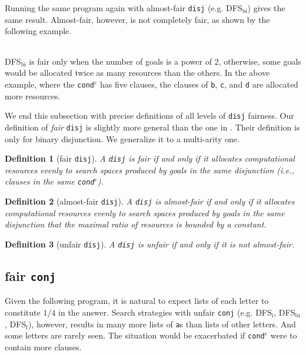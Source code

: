 \documentclass[format=acmlarge, review=true, authordraft=true]{acmart}
\newcommand{\conde}{\texttt{cond$^e$}}
\newcommand{\conj}{\texttt{conj}}
\newcommand{\disj}{\texttt{disj}}
\newcommand{\DFSi }[0]{DFS$_\textrm{i}$}
\newcommand{\DFSf }[0]{DFS$_\textrm{f}$}
\newcommand{\DFSbi}[0]{DFS$_\textrm{bi}$}
\newtheorem{defn}{Definition}[section]
\begin{document}
Running the same program again with almost-fair \disj {} (e.g. 
DFS$_\textrm{bi}$) gives the same result. Almost-fair, however, is not 
completely fair, as shown by the following example. 

\begin{center}
	\begin{tabular}{c}
		
	\end{tabular}
\end{center}

\DFSbi{} is fair only when the number of goals is a power of 2, 
otherwise, some goals would be allocated twice as many resources than the 
others. In the above example, where the \conde{} has five clauses, the clauses 
of \texttt{b}, \texttt{c}, and \texttt{d} are allocated more resources.

We end this subsection with precise definitions of all levels of 
\disj{} fairness. Our definition of \emph{fair} \disj{} is slightly 
more general
than the one in \citet{seres1999algebra}. Their definition is only
for binary disjunction. We generalize it to a multi-arity one.

\begin{defn}[fair \disj{}]
A \disj{} is fair if and only if it allocates computational resources evenly to 
search spaces produced by goals in the same disjunction 
(i.e., clauses in the same \conde).
\end{defn}

\begin{defn}[almost-fair \disj{}]
A \disj{} is almost-fair if and only if it allocates computational resources
evenly to search spaces produced by goals in the same disjunction that 
the maximal ratio of resources is bounded by a constant.
\end{defn}

\begin{defn}[unfair \disj{}]
A \disj{} is unfair if and only if it is not almost-fair.
\end{defn}

\subsection{fair \texttt{conj}}


Given the following program, it is natural to expect lists of each letter to
constitute $1/4$ in the answer. Search strategies with unfair \conj{} (e.g. 
\DFSi, \DFSbi, \DFSf), however, results in many more lists of \texttt{a}s than 
lists of other letters. And some letters are rarely seen. The situation would 
be exacerbated if \conde{} were to contain more clauses.
\end{document}

